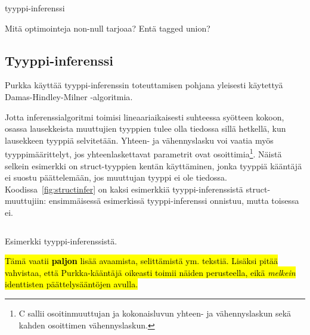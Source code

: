 tyyppi-inferenssi

Mitä optimointeja non-null tarjoaa? Entä tagged union?

\subsection{Tyyppi-inferenssi}

Purkka käyttää tyyppi-inferenssin toteuttamisen pohjana yleisesti käytettyä
Damas-Hindley-Milner -algoritmia\citep{hindley, milner, damas}.

Jotta inferenssialgoritmi toimisi lineaariaikaisesti suhteessa syötteen kokoon,
osassa lausekkeista muuttujien tyyppien tulee olla tiedossa sillä hetkellä, kun
lausekkeen tyyppiä selvitetään. Yhteen- ja vähennyslasku voi vaatia myös
tyyppimäärittelyt, jos yhteenlaskettavat parametrit ovat osoittimia\footnote{C
sallii osoitinmuuttujan ja kokonaisluvun yhteen- ja vähennyslaskun sekä kahden
osoittimen vähennyslaskun.}. Näistä selkein esimerkki on struct-tyyppien kentän
käyttäminen, jonka tyyppiä kääntäjä ei suostu päättelemään, jos muuttujan
tyyppi ei ole tiedossa. Koodissa~\ref{fig:structinfer} on kaksi esimerkkiä
tyyppi-inferenssistä struct-muuttujiin: ensimmäisessä esimerkissä
tyyppi-inferenssi onnistuu, mutta toisessa ei.

\begin{listing}[ht!]
    \inputminted{Rust}{koodi/infer.prk}
    \caption{Esimerkki tyyppi-inferenssistä.}
    \label{fig:structinfer}
\end{listing}

\FloatBarrier

\hl{Tämä vaatii \textbf{paljon} lisää avaamista, selittämistä ym. tekstiä.
Lisäksi pitää vahvistaa, että Purkka-kääntäjä oikeasti toimii näiden
perusteella, eikä \emph{melkein} identtisten päättelysääntöjen avulla.}

\newcommand{\hmtag}[1]{\tag*{[#1]\hspace*{1cm}}}

